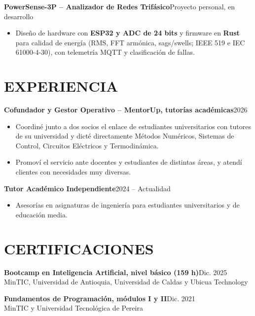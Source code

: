 \documentclass[10pt,a4paper]{article}
\newcommand{\entrada}[3]{%
    \noindent\textbf{#1}\hfill{\small\color{secundario}#2}\\[-1pt]
    {\small\color{secundario}#3}\par\vspace{2pt}%
}
\begin{document}
\entrada{PowerSense-3P -- Analizador de Redes Trifásico}{Proyecto personal, en desarrollo}{}
\vspace{-6pt}
\begin{itemize}
    \item Diseño de hardware con \textbf{ESP32 y ADC de 24 bits} y firmware en \textbf{Rust} para calidad de energía (RMS, FFT armónica, sags/swells; IEEE 519 e IEC 61000-4-30), con telemetría MQTT y clasificación de fallas.
\end{itemize}

\section*{EXPERIENCIA}

\entrada{Cofundador y Gestor Operativo -- MentorUp, tutorías académicas}{2026}{}
\vspace{-6pt}
\begin{itemize}
    \item Coordiné junto a dos socios el enlace de estudiantes universitarios con tutores de su universidad y dicté directamente Métodos Numéricos, Sistemas de Control, Circuitos Eléctricos y Termodinámica.
    \item Promoví el servicio ante docentes y estudiantes de distintas áreas, y atendí clientes con necesidades muy diversas.
\end{itemize}
\vspace{4pt}

\entrada{Tutor Académico Independiente}{2024 -- Actualidad}{}
\vspace{-6pt}
\begin{itemize}
    \item Asesorías en asignaturas de ingeniería para estudiantes universitarios y de educación media.
\end{itemize}

\section*{CERTIFICACIONES}
\entrada{Bootcamp en Inteligencia Artificial, nivel básico (159 h)}{Dic. 2025}{MinTIC, Universidad de Antioquia, Universidad de Caldas y Ubicua Technology}
\entrada{Fundamentos de Programación, módulos I y II}{Dic. 2021}{MinTIC y Universidad Tecnológica de Pereira}
\end{document}
